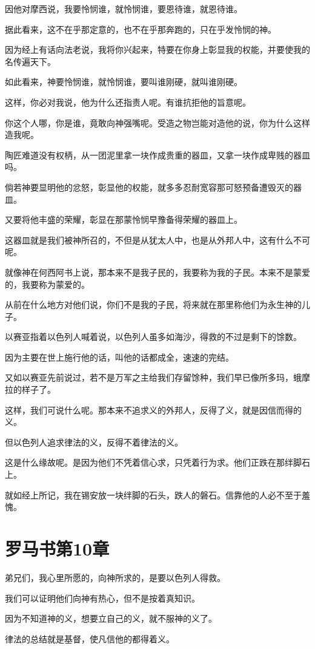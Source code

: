 \documentclass[12pt,oneside]{book}
\begin{document}
因他对摩西说，我要怜悯谁，就怜悯谁，要恩待谁，就恩待谁。

据此看来，这不在乎那定意的，也不在乎那奔跑的，只在乎发怜悯的神。

因为经上有话向法老说，我将你兴起来，特要在你身上彰显我的权能，并要使我的名传遍天下。

如此看来，神要怜悯谁，就怜悯谁，要叫谁刚硬，就叫谁刚硬。

这样，你必对我说，他为什么还指责人呢。有谁抗拒他的旨意呢。

你这个人哪，你是谁，竟敢向神强嘴呢。受造之物岂能对造他的说，你为什么这样造我呢。

陶匠难道没有权柄，从一团泥里拿一块作成贵重的器皿，又拿一块作成卑贱的器皿吗。

倘若神要显明他的忿怒，彰显他的权能，就多多忍耐宽容那可怒预备遭毁灭的器皿。

又要将他丰盛的荣耀，彰显在那蒙怜悯早豫备得荣耀的器皿上。

这器皿就是我们被神所召的，不但是从犹太人中，也是从外邦人中，这有什么不可呢。

就像神在何西阿书上说，那本来不是我子民的，我要称为我的子民。本来不是蒙爱的，我要称为蒙爱的。

从前在什么地方对他们说，你们不是我的子民，将来就在那里称他们为永生神的儿子。

以赛亚指着以色列人喊着说，以色列人虽多如海沙，得救的不过是剩下的馀数。

因为主要在世上施行他的话，叫他的话都成全，速速的完结。

又如以赛亚先前说过，若不是万军之主给我们存留馀种，我们早已像所多玛，蛾摩拉的样子了。

这样，我们可说什么呢。那本来不追求义的外邦人，反得了义，就是因信而得的义。

但以色列人追求律法的义，反得不着律法的义。

这是什么缘故呢。是因为他们不凭着信心求，只凭着行为求。他们正跌在那绊脚石上。

就如经上所记，我在锡安放一块绊脚的石头，跌人的磐石。信靠他的人必不至于羞愧。

\chapter{罗马书第10章}
弟兄们，我心里所愿的，向神所求的，是要以色列人得救。

我们可以证明他们向神有热心，但不是按着真知识。

因为不知道神的义，想要立自己的义，就不服神的义了。

律法的总结就是基督，使凡信他的都得着义。
\end{document}
